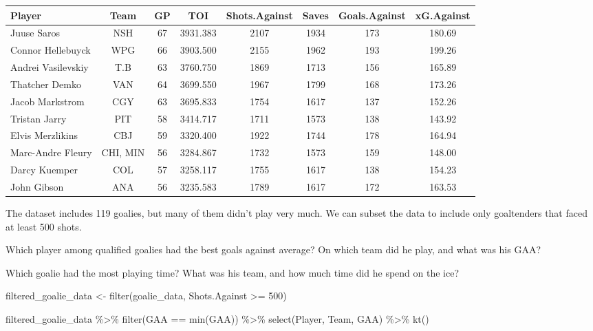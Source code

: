 \documentclass[
  11pt,
]{book}
\newenvironment{Shaded}{\begin{snugshade}}{\end{snugshade}}
\newcommand{\DecValTok}[1]{\textcolor[rgb]{0.00,0.00,0.81}{#1}}
\newcommand{\FunctionTok}[1]{\textcolor[rgb]{0.00,0.00,0.00}{#1}}
\newcommand{\NormalTok}[1]{#1}
\newcommand{\OtherTok}[1]{\textcolor[rgb]{0.56,0.35,0.01}{#1}}
\newcommand{\SpecialCharTok}[1]{\textcolor[rgb]{0.00,0.00,0.00}{#1}}
\theoremstyle{definition}
\theoremstyle{definition}
\theoremstyle{definition}
\theoremstyle{definition}
\theoremstyle{remark}
\begin{document}
\begin{table}[H]
\centering
\begin{tabular}{l|c|c|c|c|c|c|c}
\hline
Player & Team & GP & TOI & Shots.Against & Saves & Goals.Against & xG.Against\\
\hline
Juuse Saros & NSH & 67 & 3931.383 & 2107 & 1934 & 173 & 180.69\\
\hline
Connor Hellebuyck & WPG & 66 & 3903.500 & 2155 & 1962 & 193 & 199.26\\
\hline
Andrei Vasilevskiy & T.B & 63 & 3760.750 & 1869 & 1713 & 156 & 165.89\\
\hline
Thatcher Demko & VAN & 64 & 3699.550 & 1967 & 1799 & 168 & 173.26\\
\hline
Jacob Markstrom & CGY & 63 & 3695.833 & 1754 & 1617 & 137 & 152.26\\
\hline
Tristan Jarry & PIT & 58 & 3414.717 & 1711 & 1573 & 138 & 143.92\\
\hline
Elvis Merzlikins & CBJ & 59 & 3320.400 & 1922 & 1744 & 178 & 164.94\\
\hline
Marc-Andre Fleury & CHI, MIN & 56 & 3284.867 & 1732 & 1573 & 159 & 148.00\\
\hline
Darcy Kuemper & COL & 57 & 3258.117 & 1755 & 1617 & 138 & 154.23\\
\hline
John Gibson & ANA & 56 & 3235.583 & 1789 & 1617 & 172 & 163.53\\
\hline
\end{tabular}
\end{table}

The dataset includes 119 goalies, but many of them didn't play very much. We can subset the data to include only goaltenders that faced at least 500 shots.

Which player among qualified goalies had the best goals against average? On which team did he play, and what was his GAA?

Which goalie had the most playing time? What was his team, and how much time did he spend on the ice?

\begin{Shaded}
\begin{Highlighting}[]
\NormalTok{filtered\_goalie\_data }\OtherTok{\textless{}{-}} \FunctionTok{filter}\NormalTok{(goalie\_data, Shots.Against }\SpecialCharTok{\textgreater{}=} \DecValTok{500}\NormalTok{)}

\NormalTok{filtered\_goalie\_data }\SpecialCharTok{\%\textgreater{}\%}
    \FunctionTok{filter}\NormalTok{(GAA }\SpecialCharTok{==} \FunctionTok{min}\NormalTok{(GAA)) }\SpecialCharTok{\%\textgreater{}\%}
    \FunctionTok{select}\NormalTok{(Player, Team, GAA) }\SpecialCharTok{\%\textgreater{}\%}
    \FunctionTok{kt}\NormalTok{()}
\end{Highlighting}
\end{Shaded}
\end{document}
